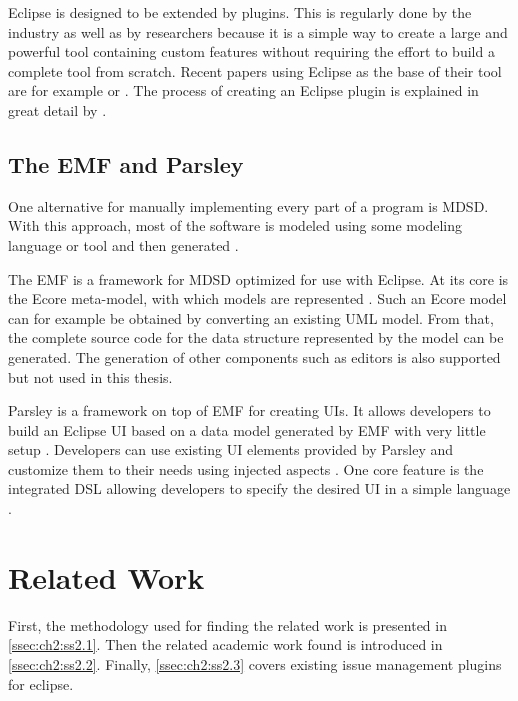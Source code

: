Eclipse is designed to be extended by plugins. This is regularly done by the industry as well as by researchers 
because it is a simple way to create a large and powerful tool containing custom features 
without requiring the effort to build a complete tool from scratch. 
Recent papers using Eclipse as the base of their tool are for example \cite{segura2019extremo} or \cite{hajji2019onto2db}. 
The process of creating an Eclipse plugin is explained in great detail by \cite{clayberg2006eclipse}.

\subsection{The \acrlong{EMF} and \gls{Parsley} }
\label{ssec:ch2:ss1.4}
One alternative for manually implementing every part of a program is \gls{MDSD}.
With this approach, most of the software is modeled using some modeling language or tool and then generated \cite{volter2013model}. 

The \gls{EMF} is a framework for \gls{MDSD} optimized for use with \gls{Eclipse}.
At its core is the Ecore meta-model, with which models are represented \cite{steinberg2008emf}.
Such an Ecore model can for example be obtained by converting an existing \gls{UML} model.
From that, the complete source code for the data structure represented by the model can be generated.
The generation of other components such as editors is also supported but not used in this thesis.

\Gls{Parsley} is a framework on top of \gls{EMF} for creating \glspl{UI}.
It allows developers to build an \gls{Eclipse} \gls{UI} based on a data model generated by \gls{EMF} with very little setup \cite{bettini2014developing}.
Developers can use existing \gls{UI} elements provided by \gls{Parsley} and customize them to their needs using injected aspects  \cite{bettini2014developing}.
One core feature is the integrated \gls{DSL} allowing developers to specify the desired \gls{UI} in a simple language \cite{bettini2014developing}.

\section{Related Work}
\label{sec:ch2:s2}
First, the methodology used for finding the related work is presented in \cref{ssec:ch2:ss2.1}.
Then the related academic work found is introduced in \cref{ssec:ch2:ss2.2}.
Finally, \cref{ssec:ch2:ss2.3} covers existing issue management plugins for eclipse.

